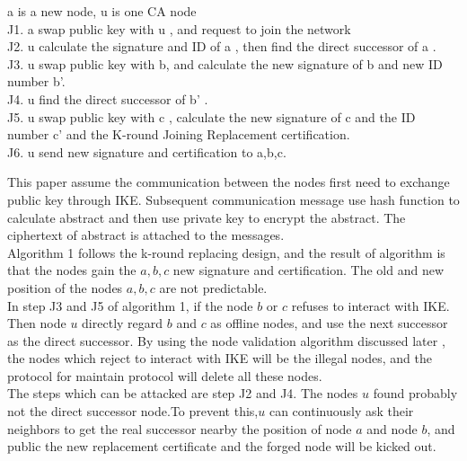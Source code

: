 \documentclass[10pt]{article}
\begin{document}
\begin{minipage}[l]{360pt}
a is a new node, u is one CA node\\
J1. a  swap public key with u , and request to join the network\\
J2. u calculate the signature and ID of a , then find the direct successor of a .\\
J3. u swap public key with b, and calculate the new signature of b and new ID number b'.\\
J4. u find the direct successor of b' .\\
J5. u swap public key with c , calculate the new signature of c and the ID number c' and the K-round Joining Replacement certification.\\
J6. u send new signature and certification to a,b,c.\\
\end{minipage}
This paper assume the communication between the nodes first need to exchange public key through IKE. Subsequent communication message use hash function to calculate abstract and then use private key to encrypt the abstract. The ciphertext of abstract is attached to the messages.\\
Algorithm 1 follows the k-round replacing design, and the result of algorithm is that the nodes   gain the $a,b,c$ new signature and certification. The old and new position of the nodes $a,b,c$ are not predictable. \\
In step J3 and J5 of algorithm 1, if the node $b$ or $c$ refuses to interact with IKE. Then node $u$ directly regard $b$ and $c$ as offline nodes, and use the next successor as the direct successor. By using the node validation algorithm discussed later ,  the nodes which reject to interact with IKE will be the illegal nodes, and the protocol for maintain protocol will delete all these nodes.\\
The steps which can be attacked are step J2 and J4. The nodes $u$ found probably not the direct successor node.To prevent this,$u$ can continuously ask their neighbors to get the real successor nearby the position of node $a$ and node $b$, and public the new replacement certificate and the forged node will be kicked out.  
\end{document}
